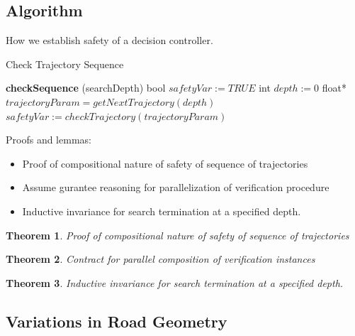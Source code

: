 \documentclass{easychair}
\theoremstyle{theorem}
\newtheorem{theorem}{Theorem}
\theoremstyle{remark}
\begin{document}
\subsection{Algorithm}
How we establish safety of a decision controller.
\begin{algorithm}
	\caption{Check Trajectory Sequence}
	\label{algo:trajseq}
	\begin{algorithmic}
		\State \textbf{checkSequence} (searchDepth)
		\State  bool $safetyVar := TRUE$
		\State int $depth := 0$
		\State float* $trajectoryParam = getNextTrajectory(depth)$
		\State $safetyVar := checkTrajectory(trajectoryParam)$
		\State
		\EndWhile
		\State {}
	\end{algorithmic}
\end{algorithm}
Proofs and lemmas:
\begin{itemize}
	\item Proof of compositional nature of safety of sequence of trajectories
	\item Assume gurantee reasoning for parallelization of verification procedure
	\item Inductive invariance for search termination at a specified depth. 
\end{itemize}

\begin{theorem}
	Proof of compositional nature of safety of sequence of trajectories
\end{theorem}

\begin{theorem}
	Contract for parallel composition of verification instances
\end{theorem}

\begin{theorem}
	Inductive invariance for search termination at a specified depth. 
\end{theorem}


\subsection{Variations in Road Geometry}
\end{document}
